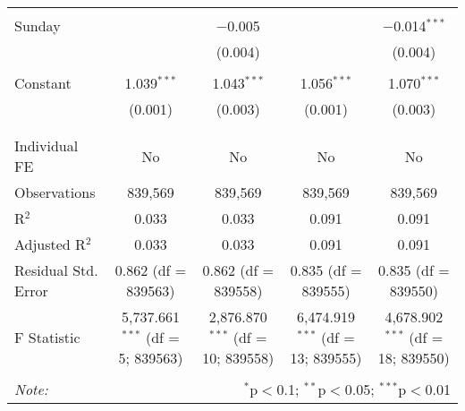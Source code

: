 \documentclass[
]{article}
\begin{document}
\begin{table}[!htbp]
{\begin{tabular}{@{\extracolsep{5pt}}lcccc}
  & & & & \\ 
 Sunday &  & $-$0.005 &  & $-$0.014$^{***}$ \\ 
  &  & (0.004) &  & (0.004) \\ 
  & & & & \\ 
 Constant & 1.039$^{***}$ & 1.043$^{***}$ & 1.056$^{***}$ & 1.070$^{***}$ \\ 
  & (0.001) & (0.003) & (0.001) & (0.003) \\ 
  & & & & \\ 
\hline \\[-1.8ex] 
Individual FE & No & No & No & No \\ 
Observations & 839,569 & 839,569 & 839,569 & 839,569 \\ 
R$^{2}$ & 0.033 & 0.033 & 0.091 & 0.091 \\ 
Adjusted R$^{2}$ & 0.033 & 0.033 & 0.091 & 0.091 \\ 
Residual Std. Error & 0.862 (df = 839563) & 0.862 (df = 839558) & 0.835 (df = 839555) & 0.835 (df = 839550) \\ 
F Statistic & 5,737.661$^{***}$ (df = 5; 839563) & 2,876.870$^{***}$ (df = 10; 839558) & 6,474.919$^{***}$ (df = 13; 839555) & 4,678.902$^{***}$ (df = 18; 839550) \\ 
\hline 
\hline \\[-1.8ex] 
\textit{Note:}  & \multicolumn{4}{r}{$^{*}$p$<$0.1; $^{**}$p$<$0.05; $^{***}$p$<$0.01} \\ 
\end{tabular}
} 
\end{table} 
\newpage
\end{document}
